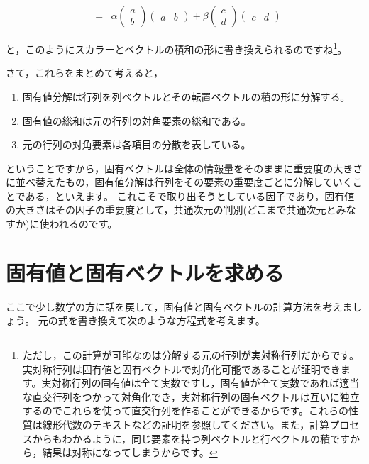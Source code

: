 \documentclass{ltjsbook}
\begin{document}
\[\begin{array}{lll}
		              &                                                                                                                                            \\
		              & = & \alpha \begin{pmatrix}a\\b\end{pmatrix}\begin{pmatrix}a &b\end{pmatrix} +
		\beta \begin{pmatrix} c\\d \end{pmatrix}\begin{pmatrix}c&d\end{pmatrix}
	\end{array}
\]

と，このようにスカラーとベクトルの積和の形に書き換えられるのですね\footnote{ただし，この計算が可能なのは分解する元の行列が実対称行列だからです。実対称行列は固有値と固有ベクトルで対角化可能であることが証明できます。実対称行列の固有値は全て実数ですし，固有値が全て実数であれば適当な直交行列をつかって対角化でき，実対称行列の固有ベクトルは互いに独立するのでこれらを使って直交行列を作ることができるからです。これらの性質は線形代数のテキストなどの証明を参照してください。また，計算プロセスからもわかるように，同じ要素を持つ列ベクトルと行ベクトルの積ですから，結果は対称になってしまうからです。}。

さて，これらをまとめて考えると，
\begin{enumerate}
	\item 固有値分解は行列を列ベクトルとその転置ベクトルの積の形に分解する。
	\item 固有値の総和は元の行列の対角要素の総和である。
	\item 元の行列の対角要素は各項目の分散を表している。
\end{enumerate}
ということですから，固有ベクトルは全体の情報量をそのままに重要度の大きさに並べ替えたもの，固有値分解は行列をその要素の重要度ごとに分解していくことである，といえます。
これこそで取り出そうとしている因子であり，固有値の大きさはその因子の重要度として，共通次元の判別(どこまで共通次元とみなすか)に使われるのです。

\section{固有値と固有ベクトルを求める}
ここで少し数学の方に話を戻して，固有値と固有ベクトルの計算方法を考えましょう。
元の式を書き換えて次のような方程式を考えます。
\end{document}
